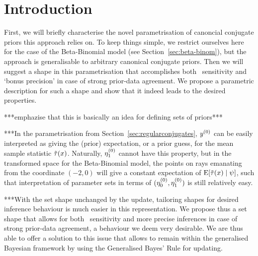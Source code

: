 \def\El{\ul{\E}}
\def\Eu{\ol{\E}}

\def\Pl{\ul{\p}}
\def\Pu{\ol{\p}}

\newcommand{\ber}{\operatorname{Ber}}   %
\newcommand{\bin}{\operatorname{Binom}} %
\newcommand{\be}{\operatorname{Beta}}   %
\newcommand{\B}{\operatorname{B}}   %




\section{Introduction}

First, we will briefly characterise the novel parametrisation of canoncial conjugate priors this approach relies on.
To keep things simple, we restrict ourselves here for the case of the Beta-Binomial model (see Section~\ref{sec:beta-binom}),
but the approach is generalisable to arbitrary canonical conjugate priors.
Then we will suggest a shape in this parametrisation that accomplishes
both \pdc\ sensitivity and `bonus precision' in case of strong prior-data agreement.
We propose a parametric description for such a shape
and show that it indeed leads to the desired properties.

***emphazise that this is basically an idea for defining sets of priors***



***In the parametrisation from Section~\ref{sec:regularconjugates},
$y^{(0)}$ can be easily interpreted as
giving the (prior) expectation, or a prior guess, for the mean sample statistic $\tilde{\tau}(x)$.
Naturally, $\eta_1^{(0)}$ cannot have this property,
but in the transformed space for the Beta-Binomial model, the points on rays emanating from the coordinate $(-2,0)$
will give a constant expectation of $\operatorname{E}[\tilde{\tau}(x) \mid \psi]$,
such that interpretation of parameter sets in terms of $(\eta_0^{(0)},\eta_1^{(0)})$ is still relatively easy.

***With the set shape unchanged by the update, 
tailoring shapes for desired inference behaviour is much easier in this representation.
We propose thus a set shape %
that allows for both \pdc\ sensitivity
and more precise inferences in case of strong prior-data agreement,
a behaviour we deem very desirable.
We are thus able to offer a solution to this issue that allows to remain within the generalised Bayesian framework
by using the Generalised Bayes' Rule for updating.




